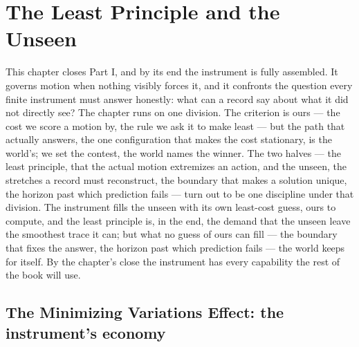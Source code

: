 \chapter{The Least Principle and the Unseen}
\label{chap:least-principle-and-the-unseen}

This chapter closes Part I, and by its end the instrument is fully assembled. It governs motion when nothing
visibly forces it, and it confronts the question every finite instrument must answer honestly: what can a
record say about what it did not directly see? The chapter runs on one division. The criterion is ours --- the
cost we score a motion by, the rule we ask it to make least --- but the path that actually answers, the one
configuration that makes the cost stationary, is the world's; we set the contest, the world names the winner.
The two halves --- the least principle, that the actual motion extremizes an action, and the unseen, the
stretches a record must reconstruct, the boundary that makes a solution unique, the horizon past which
prediction fails --- turn out to be one discipline under that division. The instrument fills the unseen with
its own least-cost guess, ours to compute, and the least principle is, in the end, the demand that the unseen
leave the smoothest trace it can; but what no guess of ours can fill --- the boundary that fixes the answer,
the horizon past which prediction fails --- the world keeps for itself. By the chapter's close the instrument
has every capability the rest of the book will use.

\section{The Minimizing Variations Effect: the instrument's economy}
\label{se:minimizing-variations}

